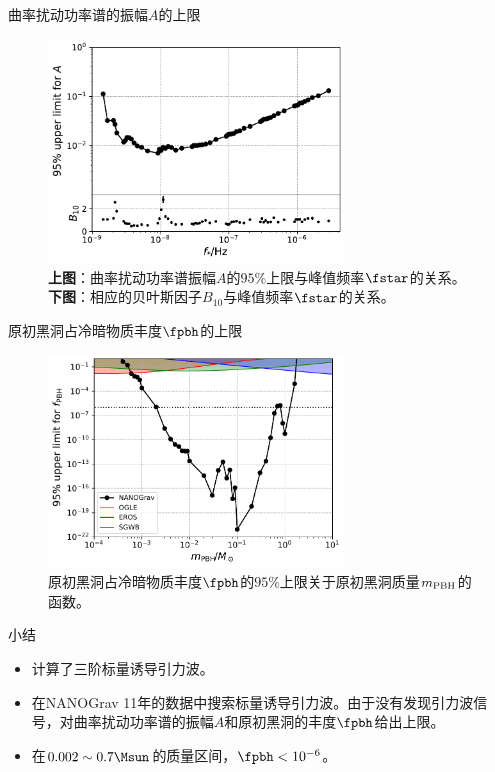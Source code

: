 \documentclass[xcolor={svgnames},compress]{beamer}
\let\olditem\item
\renewcommand{\item}{%
    \olditem\vspace{\fill}}
\begin{document}
\begin{frame}{曲率扰动功率谱的振幅$A$的上限}
    \begin{figure}[h!]
        \centering
        \includegraphics[width=0.7\textwidth]{A_upper.pdf}
        \caption{\label{A_upper} \textbf{上图}：曲率扰动功率谱振幅$A$的$95\%$上限与峰值频率$\fstar$的关系。\textbf{下图}：相应的贝叶斯因子$B_{10}$与峰值频率$\fstar$的关系。
        }
    \end{figure}
    
\end{frame}

\begin{frame}{原初黑洞占冷暗物质丰度$\fpbh$的上限}
    \begin{figure}[h!]
        \centering
        \includegraphics[width=0.7\textwidth]{fpbh_upper.pdf}
        \caption{\label{fpbh_upper} 原初黑洞占冷暗物质丰度$\fpbh$的$95\%$上限关于原初黑洞质量$m_{\rm{PBH}}$的函数。}
    \end{figure}    
\end{frame}

\begin{frame}{小结}	
    \begin{itemize}        
        \item 计算了三阶标量诱导引力波。
        \item 在NANOGrav 11年的数据中搜索标量诱导引力波。由于没有发现引力波信号，对曲率扰动功率谱的振幅$A$和原初黑洞的丰度$\fpbh$给出上限。
        \item 在$0.002\sim 0.7\Msun$的质量区间，$\fpbh < 10^{-6}$。
    \end{itemize}
\end{frame}
\end{document}
